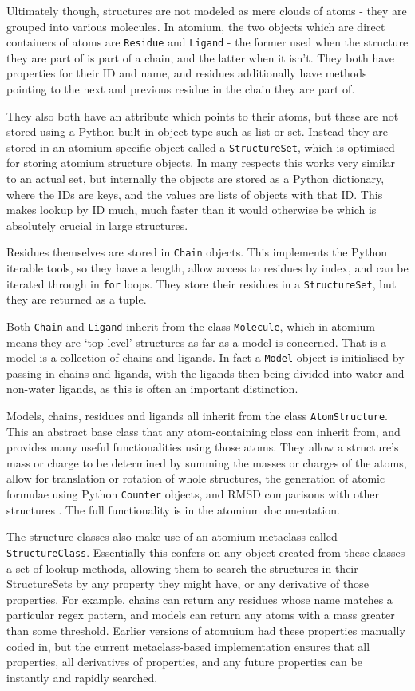 Ultimately though, structures are not modeled as mere clouds of atoms - they are grouped into various molecules. In atomium, the two objects which are direct containers of atoms are \texttt{Residue} and \texttt{Ligand} - the former used when the structure they are part of is part of a chain, and the latter when it isn't. They both have properties for their ID and name, and residues additionally have methods pointing to the next and previous residue in the chain they are part of.

They also both have an attribute which points to their atoms, but these are not stored using a Python built-in object type such as list or set. Instead they are stored in an atomium-specific object called a \texttt{StructureSet}, which is optimised for storing atomium structure objects. In many respects this works very similar to an actual set, but internally the objects are stored as a Python dictionary, where the IDs are keys, and the values are lists of objects with that ID. This makes lookup by ID much, much faster than it would otherwise be which is absolutely crucial in large structures.

Residues themselves are stored in \texttt{Chain} objects. This implements the Python iterable tools, so they have a length, allow access to residues by index, and can be iterated through in \texttt{for} loops. They store their residues in a \texttt{StructureSet}, but they are returned as a tuple.

Both \texttt{Chain} and \texttt{Ligand} inherit from the class \texttt{Molecule}, which in atomium means they are `top-level' structures as far as a model is concerned. That is a model is a collection of chains and ligands. In fact a \texttt{Model} object is initialised by passing in chains and ligands, with the ligands then being divided into water and non-water ligands, as this is often an important distinction.

Models, chains, residues and ligands all inherit from the class \texttt{AtomStructure}. This an abstract base class that any atom-containing class can inherit from, and provides many useful functionalities using those atoms. They allow a structure's mass or charge to be determined by summing the masses or charges of the atoms, allow for translation or rotation of whole structures, the generation of atomic formulae using Python \texttt{Counter} objects, and RMSD comparisons with other structures . The full functionality is in the atomium documentation.

The structure classes also make use of an atomium metaclass called \texttt{StructureClass}. Essentially this confers on any object created from these classes a set of lookup methods, allowing them to search the structures in their StructureSets by any property they might have, or any derivative of those properties. For example, chains can return any residues whose name matches a particular regex pattern, and models can return any atoms with a mass greater than some threshold. Earlier versions of atomuium had these properties manually coded in, but the current metaclass-based implementation ensures that all properties, all derivatives of properties, and any future properties can be instantly and rapidly searched.

